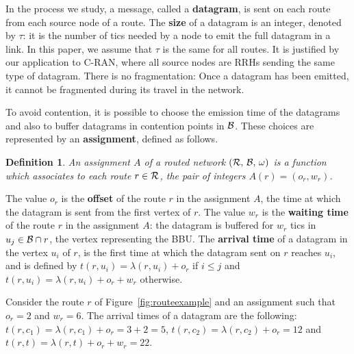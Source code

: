 \documentclass[a4paper,10pt]{journal}
\newtheorem{definition}{Definition}
\begin{document}
        In the process we study, a message, called a {\bf datagram}, is sent on each route from each source node of a route. The \textbf{size} of a datagram is an integer, denoted by $\tau$: it is the number of tics needed by a node to emit the full datagram in a link. In this paper, we assume that $\tau$ is the same for all routes. It is justified by our application to C-RAN, where all source nodes are RRHs sending the same type of datagram. There is no fragmentation: Once a datagram has been emitted, it cannot be fragmented during its travel in the network. 

        To avoid contention, it is possible to choose the emission time of the datagrams and also to buffer datagrams in contention points in $\cal{B}$.
        These choices are represented by an \textbf{assignment}, defined as follows.

         \begin{definition}
         An assignment $A$ of a routed network $(\cal{R},\,\cal{B},\,\omega)$ is a function which associates to each route $r \in \cal{R}$, the pair of integers $A(r) = (o_r,w_r)$.
         \end{definition}
        The value $o_r$ is the \textbf{offset} of the route $r$ in the assignment $A$, the time at which the datagram is sent from the first vertex of $r$.
         The value $w_r$ is the \textbf{waiting time} of the route $r$ in the assignment $A$: the datagram is buffered for $w_r$ tics in $u_j \in {\cal B} \cap r$, the vertex representing the BBU.
 		The \textbf{arrival time} of a datagram in the vertex $u_i$ of $r$, is the first time at which the datagram sent on $r$ reaches $u_i$, and is defined by $t(r,u_i) = \lambda(r,u_i) + o_r $ if 
 		$i \leq j$ and $t(r,u_i) = \lambda(r,u_i) + o_r + w_r$ otherwise.

        \begin{examplee}
        Consider the route $r$ of Figure~\ref{fig:routeexample} and an assignment such that $o_r=2$ and $w_r = 6$. The arrival times of a datagram are the following: $t(r,c_1) =  \lambda(r,c_1) + o_r =  3 + 2 = 5$, $t(r,c_2) = \lambda(r,c_2) + o_r = 12$ and  $t(r,t) = \lambda(r,t) + o_r + w_r  = 22$.
        \end{examplee}
\end{document}
